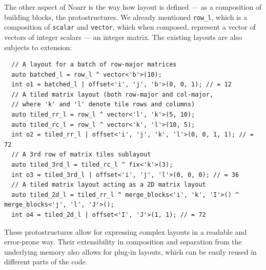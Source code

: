 The other aspect of Noarr is the way how layout is defined --- as a composition of building blocks, the protostructures. We already mentioned \texttt{row\_l}, which is a composition of \texttt{scalar} and \texttt{vector}, which when composed, represent a vector of vectors of integer scalars --- an integer matrix. The existing layouts are also subjects to extension:
\begin{verbatim}
  // A layout for a batch of row-major matrices
  auto batched_l = row_l ^ vector<'b'>(10);
  int o1 = batched_l | offset<'i', 'j', 'b'>(0, 0, 1); // = 12
  // A tiled matrix layout (both row-major and col-major, 
  // where 'k' and 'l' denote tile rows and columns)
  auto tiled_rr_l = row_l ^ vector<'l', 'k'>(5, 10);
  auto tiled_rc_l = row_l ^ vector<'k', 'l'>(10, 5);
  int o2 = tiled_rr_l | offset<'i', 'j', 'k', 'l'>(0, 0, 1, 1); // = 72
  // A 3rd row of matrix tiles sublayout
  auto tiled_3rd_l = tiled_rc_l ^ fix<'k'>(3);
  int o3 = tiled_3rd_l | offset<'i', 'j', 'l'>(0, 0, 0); // = 36
  // A tiled matrix layout acting as a 2D matrix layout
  auto tiled_2d_l = tiled_rr_l ^ merge_blocks<'i', 'k', 'I'>() ^ merge_blocks<'j', 'l', 'J'>();
  int o4 = tiled_2d_l | offset<'I', 'J'>(1, 1); // = 72
\end{verbatim}

These protostructures allow for expressing complex layouts in a readable and error-prone way. Their extensibility in composition and separation from the underlying memory also allows for plug-in layouts, which can be easily reused in different parts of the code.




